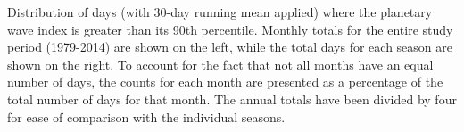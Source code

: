 \label{fig:annual_distribution}
Distribution of days (with 30-day running mean applied) where the planetary wave index is greater than its 90th percentile. Monthly totals for the entire study period (1979-2014) are shown on the left, while the total days for each season are shown on the right. To account for the fact that not all months have an equal number of days, the counts for each month are presented as a percentage of the total number of days for that month. The annual totals have been divided by four for ease of comparison with the individual seasons.   